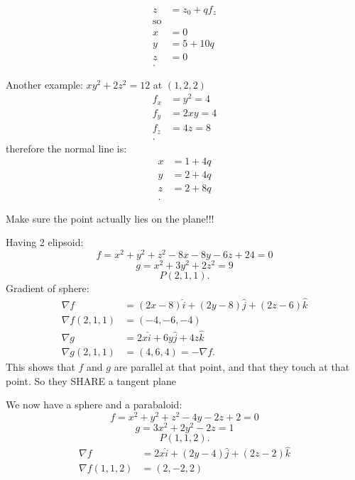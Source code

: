 \begin{itemize}
\begin{example}
\begin{align*}
		z &=  z_0 + qf_z \\
		\text{so}\\
		x &=  0 \\
		y &=  5 + 10q \\
		z &=  0 \\
	.\end{align*}
\end{example}
\begin{example}
	Another example: $xy^2 + 2z^2 = 12$ at $\left( 1,2,2 \right) $ 
	\begin{align*}
		f_x &=  y^2 =  4 \\
		f_y &= 2xy =  4  \\
		f_z &=  4z =  8 \\
	.\end{align*}
	therefore the normal line is:
	\begin{align*}
		x &= 1+4q\\
		y &=  2+4q \\
		z &= 2 +8q\\
	.\end{align*}
\end{example}
\begin{warning}
Make sure the point actually lies on the plane!!!
\end{warning}
\begin{example}
	Having 2 elipsoid:
	\[
	f = x^2 +y^2 + z^2 - 8x-8y-6z+24 = 0\]
	\[
	g = x^2 + 3y^2 + 2z^2 = 9\]\[
	P\left( 2,1,1 \right) 
	.\] 
	Gradient of sphere:
	\begin{align*}
		\nabla f &=  \left( 2x-8 \right) \hat{i} + \left( 2y-8 \right) \hat{j} + \left( 2z-6 \right) \hat{k} \\
		\nabla f\left( 2,1,1 \right)  &= \left( -4,-6,-4 \right) \\
		\nabla g &=  2x\hat{i} + 6y\hat{j} + 4z\hat{k} \\
		\nabla g\left( 2,1,1 \right)  &= (4,6,4) = -\nabla f
	.\end{align*}
	This shows that $f$ and $g$ are parallel at that point, and that they touch at that point. So they SHARE a tangent plane
\end{example}
\begin{example}
	We now have a sphere and a parabaloid:
\[
f = x^2 + y^2 + z^2 - 4y-2z + 2 = 0\]\[
g = 3x^2 + 2y^2 -2z = 1\]\[
P\left( 1,1,2 \right) 
.\] 
\begin{align*}
	\nabla f &= 2x\hat{i} + \left( 2y-4 \right) \hat{j} + \left( 2z-2 \right) \hat{k} \\
	\nabla f\left( 1,1,2 \right)  &=  \left( 2,-2,2 \right) \\

\end{align*}
\end{example}
\end{itemize}
